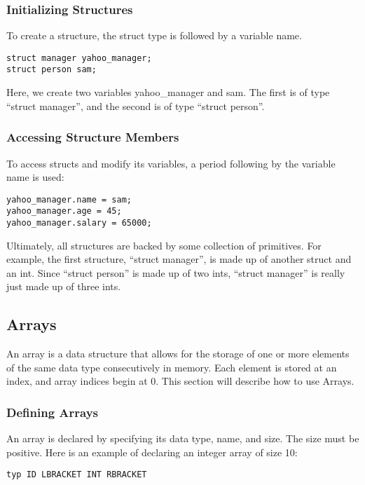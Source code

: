\documentclass{article}
\begin{document}
\subsubsection{Initializing Structures}
To create a structure, the struct type is followed by a variable name. 
\begin{lstlisting}
struct manager yahoo_manager;
struct person sam;
\end{lstlisting}

Here, we create two variables yahoo\_manager and sam. The first is of type ``struct manager'', and the second is of type ``struct person''.

\subsubsection{Accessing Structure Members}

 To access structs and modify its variables, a period following by the variable name is used:

 \begin{lstlisting}
yahoo_manager.name = sam;
yahoo_manager.age = 45;
yahoo_manager.salary = 65000;
\end{lstlisting}

Ultimately, all structures are backed by some collection of primitives. For example, the first structure, ``struct manager'', is made up of another struct and an int. Since ``struct person'' is made up of two ints, ``struct manager'' is really just made up of three ints. 


\subsection{Arrays}
An array is a data structure that allows for the storage of one or more elements of the same data type consecutively in memory. Each element is stored at an index, and array indices begin at 0. This section will describe how to use Arrays.

\subsubsection{Defining Arrays}
An array is declared by specifying its data type, name, and size. The size must be positive. Here is an example of declaring an integer array of size 10:

\begin{Verbatim}[frame=single]
typ ID LBRACKET INT RBRACKET
\end{Verbatim}
\end{document}
